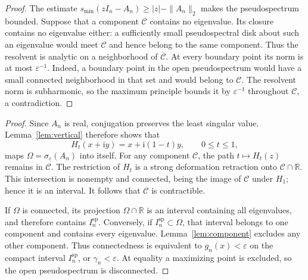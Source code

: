 \documentclass[preprints,article,accept,oneauthor]{Definitions/mdpi}
\numberwithin{equation}{section}
\newcounter{result}[section]
\theoremstyle{mdpi}
\newtheorem{lemma}[result]{Lemma}
\newtheorem{proposition}[result]{Proposition}
\theoremstyle{definition}
\newcommand{\R}{\mathbb R}
\newcommand{\ii}{\mathrm i}
\begin{document}

\begin{proof}
The estimate \(s_{\min}(zI_n-A_n)\geq |z|-\|A_n\|_2\) makes the
pseudospectrum bounded.  Suppose that a component \(\mathcal C\) contains
no eigenvalue.  Its closure contains no eigenvalue either: a sufficiently
small pseudospectral disk about such an eigenvalue would meet
\(\mathcal C\) and hence belong to the same component.  Thus the resolvent
is analytic on a neighborhood of \(\overline{\mathcal C}\).
At every boundary point its norm is at most \(\varepsilon^{-1}\).
Indeed, a boundary point in the open pseudospectrum would have a small
connected neighborhood in that set and would belong to \(\mathcal C\).
The resolvent norm is subharmonic, so the maximum principle bounds it by
\(\varepsilon^{-1}\) throughout \(\mathcal C\), a contradiction.
\end{proof}


\begin{proof}
Since \(A_n\) is real, conjugation preserves the least singular value.
Lemma~\ref{lem:vertical} therefore shows that
\[
 H_t(x+\ii y)=x+\ii(1-t)y,\qquad0\leq t\leq1,
\]
maps \(\Omega=\sigma_\varepsilon(A_n)\) into itself.  For any component
\(\mathcal C\), the path \(t\mapsto H_t(z)\) remains in \(\mathcal C\).
The restriction of \(H_t\) is a strong deformation retraction onto
\(\mathcal C\cap\R\).  This intersection is nonempty and connected,
being the image of \(\mathcal C\) under \(H_1\); hence it is an interval.
It follows that \(\mathcal C\) is contractible.

If \(\Omega\) is connected, its projection \(\Omega\cap\R\) is an interval
containing all eigenvalues, and therefore contains \(I_n^{\mathrm{sp}}\).
Conversely, if \(I_n^{\mathrm{sp}}\subset\Omega\), that interval belongs
to one component and contains every eigenvalue.  Lemma~\ref{lem:component}
excludes any other component.  Thus connectedness is equivalent to
\(g_n(x)<\varepsilon\) on the compact interval \(I_n^{\mathrm{sp}}\),
or \(\gamma_n<\varepsilon\).  At equality a maximizing point is excluded,
so the open pseudospectrum is disconnected.
\end{proof}
\end{document}
